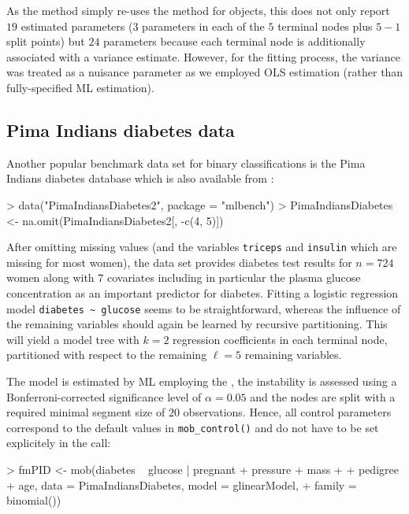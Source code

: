 \documentclass{Z}
\begin{document}
As the  method simply re-uses the method for  objects,
this does not only report $19$ estimated parameters ($3$ parameters in
each of the $5$ terminal nodes plus $5 - 1$ split points) but
$24$ parameters because each terminal node is additionally associated with a 
variance estimate. However, for the fitting process, the variance was treated as a nuisance 
parameter as we employed OLS estimation (rather than fully-specified ML estimation). 


\subsection{Pima Indians diabetes data}

Another popular benchmark data set for binary classifications is the Pima Indians
diabetes database which is also available from :

\begin{Schunk}
\begin{Sinput}
> data("PimaIndiansDiabetes2", package = "mlbench")
> PimaIndiansDiabetes <- na.omit(PimaIndiansDiabetes2[, -c(4, 5)])
\end{Sinput}
\end{Schunk}

After omitting missing values (and the variables \verb:triceps: and \verb:insulin: which
are missing for most women), the data set provides diabetes test results for
$n = 724$ women
along with $7$ covariates including in particular
the plasma glucose concentration  as an important predictor for diabetes.
Fitting a logistic regression model \verb:diabetes ~ glucose: seems to be straightforward,
whereas the influence of the remaining variables should again be learned by recursive
partitioning. This will yield a model tree with $k = 2$ regression coefficients in each terminal
node, partitioned with respect to the remaining $\ell = 5$ remaining variables.

The model is estimated by ML employing the , 
the instability is assessed using a Bonferroni-corrected
significance level of $\alpha = 0.05$ and the nodes are split with a required minimal
segment size of $20$ observations. Hence, all control parameters correspond to the
default values in \verb:mob_control(): and do not have to be set explicitely in 
the  call:

\begin{Schunk}
\begin{Sinput}
> fmPID <- mob(diabetes ~ glucose | pregnant + pressure + mass + 
+     pedigree + age, data = PimaIndiansDiabetes, model = glinearModel, 
+     family = binomial())
\end{Sinput}
\end{Schunk}
\end{document}
